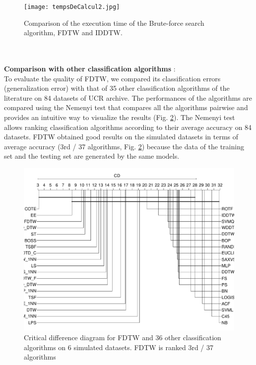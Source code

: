 \begin{figure}
\center
\texttt{[image: tempsDeCalcul2.jpg]}
\caption{Comparison of the execution time of
the Brute-force search algorithm, FDTW and IDDTW. }

\label{tempsDeCalcul}

\end{figure}



\\
 \paragraph{}\textbf{Comparison with other classification algorithms} : \\
To evaluate the quality of FDTW, we compared its classification errors (generalization error) with that of 35 other classification algorithms \cite{bagnall2016great} of the literature on 84 datasets of UCR archive{{}}.
 The performances of the algorithms are compared using 
the Nemenyi test that compares all the algorithms pairwise and  provides an intuitive way to
visualize the results (Fig. \ref{cd2}). The Nemenyi test allows ranking  classification algorithms according to their average accuracy on 84 datasets.
 FDTW obtained good results on the simulated datasets in terms of average accuracy (3rd / 37 algorithms, Fig. \ref{cd2}) because the data of the training set and the testing set are generated by the same models.

\begin{figure}
\centering
\includegraphics[scale=0.28]{images/cd1}
\caption{Critical difference diagram for FDTW and $36$ other classification algorithms on 6 simulated datasets. FDTW is ranked 3rd / 37 algorithms}

\label{cd2}
\end{figure}



